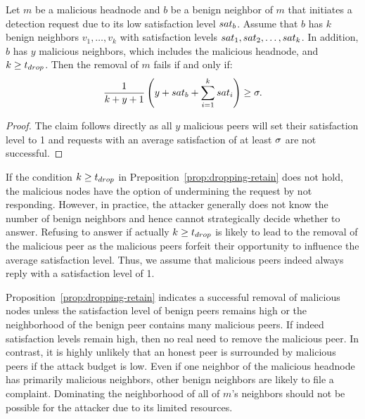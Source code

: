 \begin{proposition}
\label{prop:dropping-retain}
Let $m$ be a malicious headnode and $b$ be a benign neighbor of $m$ that initiates a detection request due to its low satisfaction level $sat_b$.
Assume that $b$ has $k$ benign neighbors $v_1, \ldots , v_k$ with satisfaction levels $sat_1, sat_2 ,\ldots  , sat_k$. In addition, $b$ has $y$ malicious neighbors, which includes the malicious headnode, and $k\geq t_{drop}$.
 Then the removal of $m$ fails if and only if: 
\begin{align}
\label{eq:drop-retain}
\frac{1}{k+y+1}\left(y+\sat_b + \sum_{i=1}^k \sat_i\right) \geq \satThres.  
\end{align} 
\end{proposition}
\begin{proof}
The claim follows directly as all $y$ malicious peers will set their satisfaction level to 1 and \drop requests with an average satisfaction of at least $\sigma$ are not successful.   
\end{proof}
If the condition $k\geq t_{drop}$ in Preposition~\ref{prop:dropping-retain} does not hold, the malicious nodes have the option of undermining the request by not responding. However, in practice, the attacker generally does not know the number of benign neighbors and hence cannot strategically decide whether to answer. Refusing to answer if actually $k\geq t_{drop}$ is likely to lead to the removal of the malicious peer as the malicious peers forfeit their opportunity to influence the average satisfaction level. Thus, we assume that malicious peers indeed always reply with a satisfaction level of 1. 

Proposition~\ref{prop:dropping-retain} indicates a successful removal of malicious nodes unless the satisfaction level of benign peers remains high or the neighborhood of the benign peer contains many malicious peers. 
If indeed satisfaction levels remain high, then no real need to remove the malicious peer.
In contrast, it is highly unlikely that an honest peer is surrounded by malicious peers if the attack budget is low.
Even if one neighbor of the malicious headnode has primarily malicious neighbors, other benign neighbors are likely to file a complaint.
Dominating the neighborhood of all of $m$'s neighbors should not be possible for the attacker due to its limited resources.

 
 